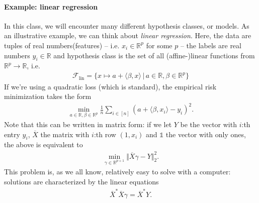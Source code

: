 \documentclass{article}
\newcommand{\calF}{\mathcal{F}}
\newcommand{\sprod}[1]{\langle #1 \rangle}
\newcommand{\R}{\mathbb{R}}
\newcommand{\norm}[1]{\Vert #1 \Vert}
\newcommand{\one}{\mathds{1}}
\begin{document}
\paragraph{Example: linear regression} In this class, we will encounter many different hypothesis classes, or models. As an illustrative example, we can think about \emph{linear regression}. Here, the data are tuples of real numbers(features) -- i.e. $x_i \in \R^p$ for some $p$ -- the labels are real numbers $y_i \in \R$ and hypothesis class is the set of all (affine-)linear functions from $\R^p \to \R$, i.e.
\begin{align*}
    \calF_{\mathrm{lin}} = \{x \mapsto a + \sprod{\beta, x} \, \vert \, a \in \R, \beta \in \R^p\}
\end{align*}
If we're using a quadratic loss (which is standard), the empirical risk minimization takes the form
\begin{align*}
    \min_{a\in \R, \beta \in \R^p} \tfrac{1}{n} \sum_{i \in [n]} (a + \sprod{\beta,x_i} - y_i)^2.
\end{align*}
Note that this can be written in matrix form: if we let $Y$ be the vector with $i$:th entry $y_i$, $\overline{X}$ the matrix with $i$:th row $(1,x_i)$ and $\one$ the vector with only ones, the above is equivalent to 
\begin{align*}
    \min_{\gamma \in \R^{p+1}} \norm{\overline{X}\gamma -Y}_2^2.
\end{align*}
This problem is, as we all know, relatively easy to solve with a computer: solutions are characterized by the linear equations
\begin{align*}
    \overline{X}^*\overline{X}\gamma = \overline{X}^*Y.
\end{align*}
\end{document}
